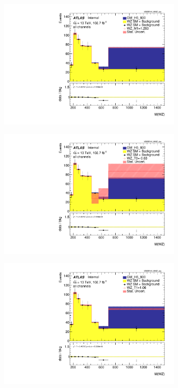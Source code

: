\documentclass[../Bachelorarbeit.tex]{subfiles}
\begin{document}
\begin{figure}[h]
\begin{subfigure}{0.3\textwidth}
        \includegraphics[width=\textwidth]{Plots/ALL_MWZ_final/GM_H5_800/M1/2022-05-07/VBSSR/all_VV_MWZ_vbs.pdf}
    \end{subfigure}
    \begin{subfigure}{0.3\textwidth}
        \includegraphics[width=\textwidth]{Plots/ALL_MWZ_final/GM_H5_800/T0/2022-05-07/VBSSR/all_VV_MWZ_vbs.pdf}
    \end{subfigure}
    \begin{subfigure}{0.3\textwidth}
        \includegraphics[width=\textwidth]{Plots/ALL_MWZ_final/GM_H5_800/T1/2022-05-07/VBSSR/all_VV_MWZ_vbs.pdf}

\end{subfigure}
\end{figure}
\end{document}
